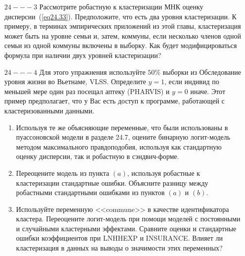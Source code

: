 \begin{enumerate}
\item[$24 --- 3$] Рассмотрите робастную к кластеризации МНК оценку дисперсии~(\ref{eq24.33}). Предположите, что есть два уровня кластеризации. К примеру, в терминах эмпирических приложений из этой главы, кластеризация может быть на уровне семьи и, затем, коммуны, если несколько членов одной семьи из одной коммуны включены в выборку. Как будет модифицироваться формула при наличии двух уровней кластеризации?

\item[$24 --- 4$] Для этого упражнения используйте $50\%$ выборки из Обследование уровня жизни во Вьетнаме, VLSS. Определите $y = 1$, если индивид по меньшей мере один раз посещал аптеку (PHARVIS) и $y = 0$ иначе. Этот пример предполагает, что у Вас есть доступ к программе, работающей с кластеризованными данными. 
\begin{enumerate}
\item Используя те же объясняющие переменные, что были использованы в пуассоновской модели в разделе 24.7, оцените бинарную логит-модель методом максимального правдоподобия, используя как стандартную оценку дисперсии, так и робастную в сэндвич-форме. 
\item Переоцените модель из пункта $(a)$, используя робастные к кластеризации стандартные ошибки. Объясните разницу между робастными стандартными ошибками из пунктов $(a)$ и $(b)$. 
\item Используйте переменную <<commune>> в качестве идентификатора кластера. Переоцените логит-модель при помощи моделей с постоянными и случайными кластерными эффектами. Сравните оценки и стандартные ошибки коэффициентов при LNHHEXP и INSURANCE. Влияет ли кластеризация в данных на выводы о значимости этих переменных? 
\end{enumerate}

\end{enumerate}




